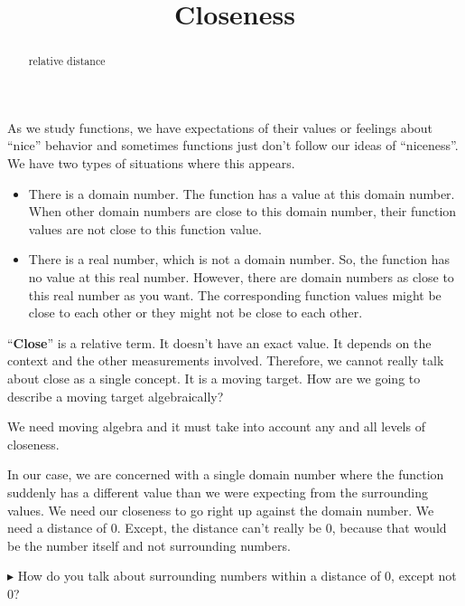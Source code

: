 \documentclass{ximera}
\title{Closeness}
\begin{document}
\begin{abstract}
relative distance
\end{abstract}
\maketitle







As we study functions, we have expectations of their values or feelings about ``nice'' behavior and sometimes functions just don't follow our ideas of ``niceness''.  We have two types of situations where this appears.

\begin{itemize}
\item There is a domain number. The function has a value at this domain number. When other domain numbers are close to this domain number, their function values are not close to this function value.
\item There is a real number, which is not a domain number. So, the function has no value at this real number. However, there are domain numbers as close to this real number as you want. The corresponding function values might be close to each other or they might not be close to each other.
\end{itemize}



``\textbf{\textcolor{purple!85!blue}{Close}}'' is a relative term.  It doesn't have an exact value.  It depends on the context and the other measurements involved.  Therefore, we cannot really talk about close as a single concept.  It is a moving target.  How are we going to describe a moving target algebraically?

We need moving algebra and it must take into account any and all levels of closeness.


In our case, we are concerned with a single domain number where the function suddenly has a different value than we were expecting from the surrounding values.  We need our closeness to go right up against the domain number. We need a distance of $0$.  Except, the distance can't really be $0$, because that would be the number itself and not surrounding numbers.

\textbf{\textcolor{red!70!darkgray}{$\blacktriangleright$}}  How do you talk about surrounding numbers within a distance of $0$, except not $0$?
\end{document}
